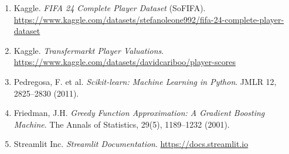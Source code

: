 \documentclass[12pt,a4paper]{report}
\begin{document}
\begin{enumerate}
  \item Kaggle. \textit{FIFA 24 Complete Player Dataset} (SoFIFA). \url{https://www.kaggle.com/datasets/stefanoleone992/fifa-24-complete-player-dataset}
  \item Kaggle. \textit{Transfermarkt Player Valuations}. \url{https://www.kaggle.com/datasets/davidcariboo/player-scores}
  \item Pedregosa, F. et al. \textit{Scikit-learn: Machine Learning in Python}. JMLR 12, 2825--2830 (2011).
  \item Friedman, J.H. \textit{Greedy Function Approximation: A Gradient Boosting Machine}. The Annals of Statistics, 29(5), 1189--1232 (2001).
  \item Streamlit Inc. \textit{Streamlit Documentation}. \url{https://docs.streamlit.io}
\end{enumerate}
\end{document}
